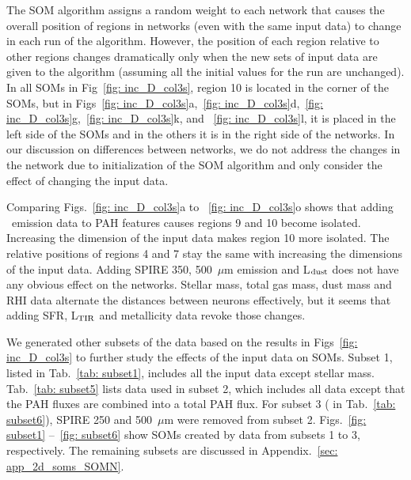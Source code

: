             The SOM algorithm assigns a random weight to each network that causes the overall position of regions in networks (even with the same input data) to change in each run of the algorithm.
            However, the position of each region relative to other regions changes dramatically only when the new sets of input data are given to the algorithm (assuming all the initial values for the run are unchanged).
            In all SOMs in Fig~\ref{fig: inc_D_col3s}, region 10 is located in the corner of the SOMs, but in  Figs~\ref{fig: inc_D_col3s}a,~\ref{fig: inc_D_col3s}d,~\ref{fig: inc_D_col3s}g,~\ref{fig: inc_D_col3s}k, and ~\ref{fig: inc_D_col3s}l, it is placed in the left side of the SOMs and in the others it is in the right side of the networks.
            In our discussion on differences between networks, we do not address the changes in the network due to initialization of the SOM algorithm and only consider the effect of changing the input data.
            
            Comparing Figs.~\ref{fig: inc_D_col3s}a to ~\ref{fig: inc_D_col3s}o shows that adding \halpha~emission data to PAH features causes regions 9 and 10 become isolated. 
            Increasing the dimension of the input data makes region 10 more isolated.
            The relative positions of regions 4 and 7 stay the same with increasing the dimensions of the input data. 
            Adding SPIRE 350, 500~$\mu$m emission and L$_{\rm dust}$ does not have any obvious effect on the networks.
            Stellar mass, total gas mass, dust mass and RHI data alternate the distances between neurons effectively, but it seems that adding SFR, L$_{\rm TIR}$ and metallicity data revoke those changes.
            
            We generated other subsets of the data based on the results in Figs~\ref{fig: inc_D_col3s} to further study the effects of the input data on SOMs.
            Subset 1, listed in Tab.~\ref{tab: subset1}, includes all the input data except stellar mass.
            Tab.~\ref{tab: subset5} lists data used in subset 2, which includes all data except that the PAH fluxes are combined into a total PAH flux. 
            For subset 3 ( in Tab.~\ref{tab: subset6}), SPIRE 250 and 500~$\mu$m were removed from subset 2.
            Figs.~\ref{fig: subset1} --~\ref{fig: subset6} show SOMs created by data from subsets 1 to 3, respectively.
            The remaining subsets are discussed in Appendix.~\ref{sec: app_2d_soms_SOMN}.

